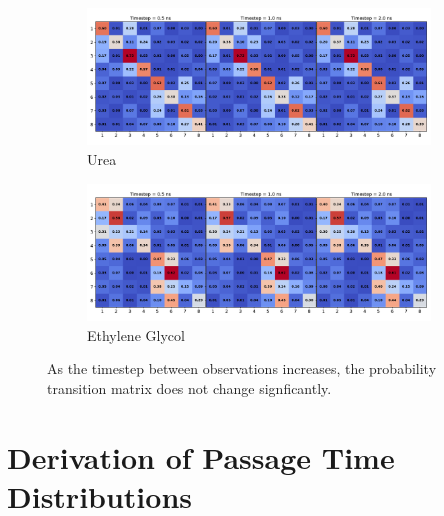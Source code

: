 \documentclass{article}
\begin{document}
  \begin{figure}
  \centering
  \begin{subfigure}{\textwidth}
  \includegraphics[width=\textwidth]{URE_transitions.pdf}
  \caption{Urea}\label{fig:URE_transitions}
  \end{subfigure}
  \begin{subfigure}{\textwidth}
  \includegraphics[width=\textwidth]{GCL_transitions.pdf}
  \caption{Ethylene Glycol}\label{fig:GCL_transitions}
  \end{subfigure}
  \caption{As the timestep between observations increases, the probability
  transition matrix does not change signficantly.}\label{fig:transitions}
  \end{figure}
  
  \section{Derivation of Passage Time Distributions}\label{section:fpt_derivation}
  
\end{document}
